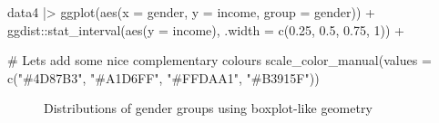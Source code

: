 \documentclass[
  letterpaper,
  DIV=11,
  numbers=noendperiod]{scrreprt}
\newenvironment{Shaded}{\begin{snugshade}}{\end{snugshade}}
\newcommand{\AttributeTok}[1]{\textcolor[rgb]{0.40,0.45,0.13}{#1}}
\newcommand{\CommentTok}[1]{\textcolor[rgb]{0.37,0.37,0.37}{#1}}
\newcommand{\DecValTok}[1]{\textcolor[rgb]{0.68,0.00,0.00}{#1}}
\newcommand{\FloatTok}[1]{\textcolor[rgb]{0.68,0.00,0.00}{#1}}
\newcommand{\FunctionTok}[1]{\textcolor[rgb]{0.28,0.35,0.67}{#1}}
\newcommand{\NormalTok}[1]{\textcolor[rgb]{0.00,0.23,0.31}{#1}}
\newcommand{\SpecialCharTok}[1]{\textcolor[rgb]{0.37,0.37,0.37}{#1}}
\newcommand{\StringTok}[1]{\textcolor[rgb]{0.13,0.47,0.30}{#1}}
\begin{document}
\begin{Shaded}
\begin{Highlighting}[]
\NormalTok{data4 }\SpecialCharTok{|\textgreater{}}
  \FunctionTok{ggplot}\NormalTok{(}\FunctionTok{aes}\NormalTok{(}\AttributeTok{x =}\NormalTok{ gender, }\AttributeTok{y =}\NormalTok{ income, }\AttributeTok{group =}\NormalTok{ gender)) }\SpecialCharTok{+}
\NormalTok{  ggdist}\SpecialCharTok{::}\FunctionTok{stat\_interval}\NormalTok{(}\FunctionTok{aes}\NormalTok{(}\AttributeTok{y =}\NormalTok{ income),}
                        \AttributeTok{.width =} \FunctionTok{c}\NormalTok{(}\FloatTok{0.25}\NormalTok{, }\FloatTok{0.5}\NormalTok{, }\FloatTok{0.75}\NormalTok{, }\DecValTok{1}\NormalTok{)) }\SpecialCharTok{+}

  \CommentTok{\# Let\textquotesingle{}s add some nice complementary colours}
  \FunctionTok{scale\_color\_manual}\NormalTok{(}\AttributeTok{values =} \FunctionTok{c}\NormalTok{(}\StringTok{"\#4D87B3"}\NormalTok{, }\StringTok{"\#A1D6FF"}\NormalTok{,}
                                \StringTok{"\#FFDAA1"}\NormalTok{, }\StringTok{"\#B3915F"}\NormalTok{))}
\end{Highlighting}
\end{Shaded}

\begin{figure}


\caption{\label{fig-homogeneity-variance-alt-vis}Distributions of gender
groups using boxplot-like geometry}

\end{figure}%
\end{document}
